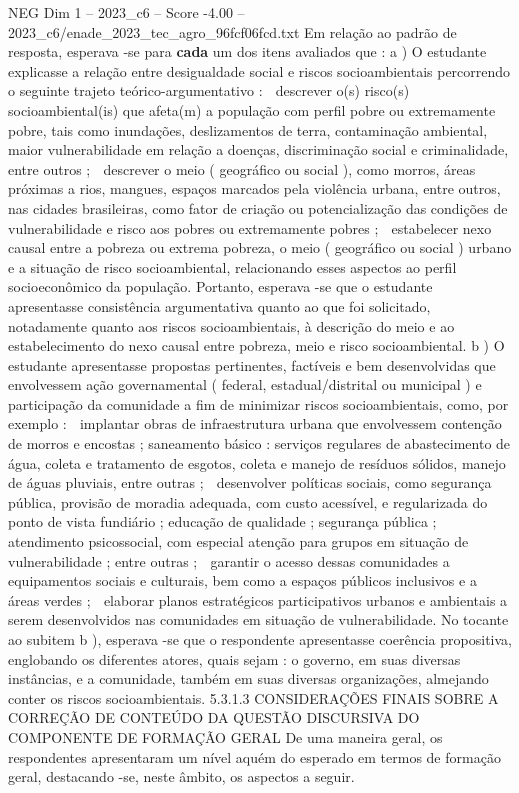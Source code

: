 \begin{textsample}{NEG Dim 1 – 2023\_c6 – Score -4.00 – 2023\_c6/enade\_2023\_tec\_agro\_96fcf06fcd.txt}
Em relação ao padrão de resposta, esperava -se para \textbf{cada} um dos itens avaliados que : a ) O estudante explicasse a relação entre desigualdade social e riscos socioambientais percorrendo o seguinte trajeto teórico-argumentativo :  descrever o(s) risco(s) socioambiental(is) que afeta(m) a população com perfil pobre ou extremamente pobre, tais como inundações, deslizamentos de terra, contaminação ambiental, maior vulnerabilidade em relação a doenças, discriminação social e criminalidade, entre outros ;  descrever o meio ( geográfico ou social ), como morros, áreas próximas a rios, mangues, espaços marcados pela violência urbana, entre outros, nas cidades brasileiras, como fator de criação ou potencialização das condições de vulnerabilidade e risco aos pobres ou extremamente pobres ;  estabelecer nexo causal entre a pobreza ou extrema pobreza, o meio ( geográfico ou social ) urbano e a situação de risco socioambiental, relacionando esses aspectos ao perfil socioeconômico da população.
Portanto, esperava -se que o estudante apresentasse consistência argumentativa quanto ao que foi solicitado, notadamente quanto aos riscos socioambientais, à descrição do meio e ao estabelecimento do nexo causal entre pobreza, meio e risco socioambiental. b ) O estudante apresentasse propostas pertinentes, factíveis e bem desenvolvidas que envolvessem ação governamental ( federal, estadual/distrital ou municipal ) e participação da comunidade a fim de minimizar riscos socioambientais, como, por exemplo :  implantar obras de infraestrutura urbana que envolvessem contenção de morros e encostas ; saneamento básico : serviços regulares de abastecimento de água, coleta e tratamento de esgotos, coleta e manejo de resíduos sólidos, manejo de águas pluviais, entre outras ;  desenvolver políticas sociais, como segurança pública, provisão de moradia adequada, com custo acessível, e regularizada do ponto de vista fundiário ; educação de qualidade ; segurança pública ; atendimento psicossocial, com especial atenção para grupos em situação de vulnerabilidade ; entre outras ;  garantir o acesso dessas comunidades a equipamentos sociais e culturais, bem como a espaços públicos inclusivos e a áreas verdes ;  elaborar planos estratégicos participativos urbanos e ambientais a serem desenvolvidos nas comunidades em situação de vulnerabilidade.
No tocante ao subitem b ), esperava -se que o respondente apresentasse coerência propositiva, englobando os diferentes atores, quais sejam : o governo, em suas diversas instâncias, e a comunidade, também em suas diversas organizações, almejando conter os riscos socioambientais. 5.3.1.3 CONSIDERAÇÕES FINAIS SOBRE A CORREÇÃO DE CONTEÚDO DA QUESTÃO DISCURSIVA DO COMPONENTE DE FORMAÇÃO GERAL De uma maneira geral, os respondentes apresentaram um nível aquém do esperado em termos de formação geral, destacando -se, neste âmbito, os aspectos a seguir.

\end{textsample}
